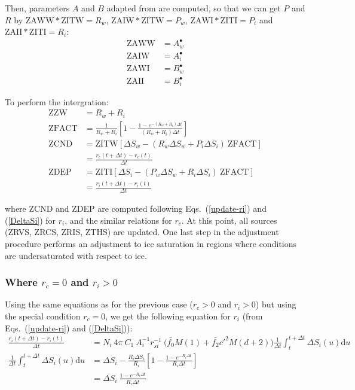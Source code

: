  Then, parameters $A$ and $B$ adapted from \citet{Reisin1996} are computed, so that we can get $P$ and $R$ by $\mathrm{ZAWW} * \mathrm{ZITW} = R_w$, $\mathrm{ZAIW} * \mathrm{ZITW} = P_w$, $\mathrm{ZAWI} * \mathrm{ZITI} = P_i$ and $\mathrm{ZAII} * \mathrm{ZITI} = R_i$:
 \begin{align}
 \mathrm{ZAWW} &= A_w^\bullet \\
 \mathrm{ZAIW} &= A_i^\bullet \\
 \mathrm{ZAWI} &= B_w^\bullet \\
 \mathrm{ZAII} &= B_i^\bullet 
 \end{align}
 
 To perform the intergration:
 \begin{align}
 \mathrm{ZZW} &= R_w + R_i \\
 \mathrm{ZFACT} &= \frac{1}{R_w + R_i} \left[ 1 - \frac{1 - e^{-(R_w + R_i)\Delta t}}{(R_w + R_i)\Delta t} \right] \\
 \mathrm{ZCND} &= \mathrm{ZITW} [\Delta S_w - (R_w \Delta S_w + P_i \Delta S_i) ~ \mathrm{ZFACT}] \\
 &= \frac{r_c(t + \Delta t) - r_c(t)}{\Delta t} \\
 \mathrm{ZDEP} &= \mathrm{ZITI} [\Delta S_i - (P_w \Delta S_w + R_i \Delta S_i) ~ \mathrm{ZFACT}] \\
 &= \frac{r_i(t + \Delta t) - r_i(t)}{\Delta t}
\end{align}

where ZCND and ZDEP are computed following Eqs.\ (\ref{update-ri}) and (\ref{DeltaSi}) for $r_i$, and the similar relations for $r_c$. At this point, all sources (ZRVS, ZRCS, ZRIS, ZTHS) are updated. One last step in the adjustment procedure performs an adjustment to ice saturation in regions where conditions are undersaturated with respect to ice.
\endgroup
 
\subsubsection{Where $r_c=0$ and $r_i>0$}

Using the same equations as for the previous case ($r_c>0$ and $r_i>0$) but using the special condition $r_c=0$, we get the following equation for $r_i$ (from Eqs.\ (\ref{update-ri}) and (\ref{DeltaSi})):
\begin{align}
 \frac{r_i(t + \Delta t) - r_i(t)}{\Delta t} &= N_i ~ 4\pi ~ C_1 ~ A_i^{-1} r_{si}^{-1} ~ \Bigg( \bar{f_0} M(1) + \bar{f_2} c'^2 M(d+2) \Bigg) \frac{1}{\Delta t} \int_t^{t + \Delta t} \Delta S_i(u) \mathrm{d}u \\
 \frac{1}{\Delta t} \int_t^{t + \Delta t} \Delta S_i(u) \mathrm{d}u &= \Delta S_i - \frac{R_i \Delta S_i}{R_i} \left[ 1 - \frac{1 - e^{-R_i\Delta t}}{R_i\Delta t} \right] \\
 &= \Delta S_i ~ \frac{1 - e^{-R_i\Delta t}}{R_i\Delta t}
\end{align}

